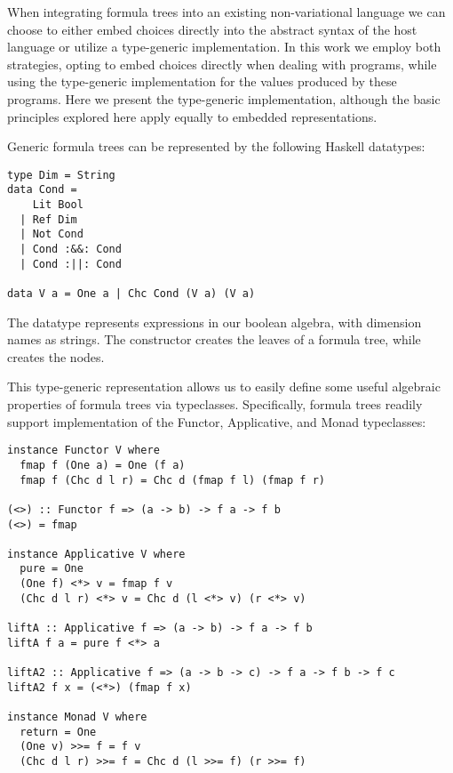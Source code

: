 \documentclass[12pt,oneside]{book}
\begin{document}
When integrating formula trees into an existing non-variational language we can choose to
either embed choices directly into the abstract syntax of the host language or utilize a type-generic
implementation. In this work we employ both strategies, opting to embed choices directly when dealing
with programs, while using the type-generic implementation for the values produced by these programs.
Here we present the type-generic implementation, although the basic principles explored here apply
equally to embedded representations.

Generic formula trees can be represented by the following Haskell datatypes:

\begin{lstlisting}
type Dim = String
data Cond =
    Lit Bool
  | Ref Dim
  | Not Cond
  | Cond :&&: Cond
  | Cond :||: Cond

data V a = One a | Chc Cond (V a) (V a)
\end{lstlisting}

The datatype  represents expressions in our boolean algebra, with dimension names as strings.
The constructor  creates the leaves of a formula tree, while  creates the nodes.

This type-generic representation allows us to easily define some useful algebraic properties of
formula trees via typeclasses. Specifically, formula trees readily support implementation of the
Functor, Applicative, and Monad typeclasses:

\begin{minipage}{\linewidth}
\begin{lstlisting}
instance Functor V where
  fmap f (One a) = One (f a)
  fmap f (Chc d l r) = Chc d (fmap f l) (fmap f r)
 
(<>) :: Functor f => (a -> b) -> f a -> f b  
(<>) = fmap
  
instance Applicative V where
  pure = One
  (One f) <*> v = fmap f v
  (Chc d l r) <*> v = Chc d (l <*> v) (r <*> v)

liftA :: Applicative f => (a -> b) -> f a -> f b
liftA f a = pure f <*> a

liftA2 :: Applicative f => (a -> b -> c) -> f a -> f b -> f c
liftA2 f x = (<*>) (fmap f x)
  
instance Monad V where
  return = One
  (One v) >>= f = f v
  (Chc d l r) >>= f = Chc d (l >>= f) (r >>= f)
\end{lstlisting}
\end{minipage}
\end{document}
